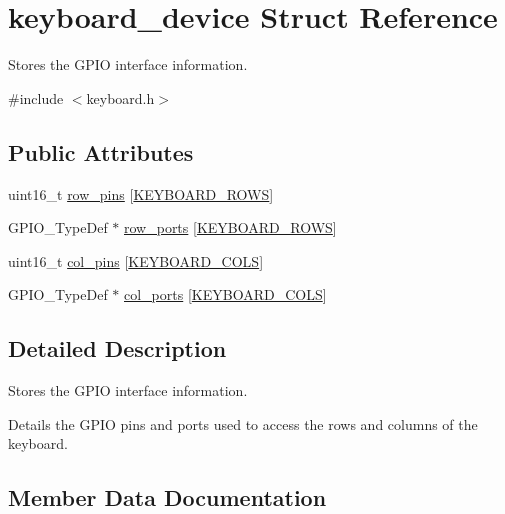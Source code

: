 \hypertarget{structkeyboard__device}{}\section{keyboard\+\_\+device Struct Reference}
\label{structkeyboard__device}


Stores the G\+P\+IO interface information.  




{\ttfamily \#include $<$keyboard.\+h$>$}

\subsection*{Public Attributes}
\begin{DoxyCompactItemize}
\item 
uint16\+\_\+t \hyperlink{structkeyboard__device_afb61cd72f0bdd515150a10e46e9ecfc3}{row\+\_\+pins} \mbox{[}\hyperlink{keymap_8h_ab89c69b09d4ca01020b7c40d9ca2bab8}{K\+E\+Y\+B\+O\+A\+R\+D\+\_\+\+R\+O\+WS}\mbox{]}
\item 
G\+P\+I\+O\+\_\+\+Type\+Def $\ast$ \hyperlink{structkeyboard__device_a3538201c09ca68013a086626a63ca362}{row\+\_\+ports} \mbox{[}\hyperlink{keymap_8h_ab89c69b09d4ca01020b7c40d9ca2bab8}{K\+E\+Y\+B\+O\+A\+R\+D\+\_\+\+R\+O\+WS}\mbox{]}
\item 
uint16\+\_\+t \hyperlink{structkeyboard__device_a6158bcd702e65e7f692b53c0c43958ed}{col\+\_\+pins} \mbox{[}\hyperlink{keymap_8h_ada65ea6a2010790e481acf033b2f8351}{K\+E\+Y\+B\+O\+A\+R\+D\+\_\+\+C\+O\+LS}\mbox{]}
\item 
G\+P\+I\+O\+\_\+\+Type\+Def $\ast$ \hyperlink{structkeyboard__device_ac896175bb4e598e4e62671f2525d93b5}{col\+\_\+ports} \mbox{[}\hyperlink{keymap_8h_ada65ea6a2010790e481acf033b2f8351}{K\+E\+Y\+B\+O\+A\+R\+D\+\_\+\+C\+O\+LS}\mbox{]}
\end{DoxyCompactItemize}


\subsection{Detailed Description}
Stores the G\+P\+IO interface information. 

Details the G\+P\+IO pins and ports used to access the rows and columns of the keyboard. 

\subsection{Member Data Documentation}
\mbox{\label{structkeyboard__device_a6158bcd702e65e7f692b53c0c43958ed}} 
